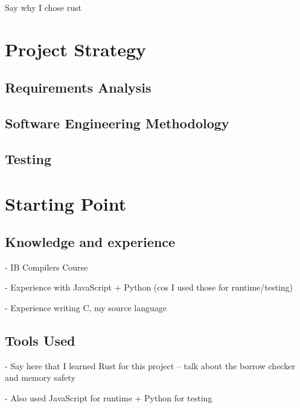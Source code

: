 \documentclass[00-main.tex]{subfiles}
\begin{document}
\begin{mrwComment}
Say why I chose rust
\end{mrwComment}

\section{Project Strategy}

\subsection{Requirements Analysis}

\subsection{Software Engineering Methodology}

\subsection{Testing}

\section{Starting Point}

\subsection{Knowledge and experience}

\begin{mrwComment}
- IB Compilers Course

- Experience with JavaScript + Python (cos I used those for runtime/testing)

- Experience writing C, my source language
\end{mrwComment}

\subsection{Tools Used}

\begin{mrwComment}
- Say here that I learned Rust for this project -- talk about the borrow checker and memory safety

- Also used JavaScript for runtime + Python for testing
\end{mrwComment}
\end{document}

